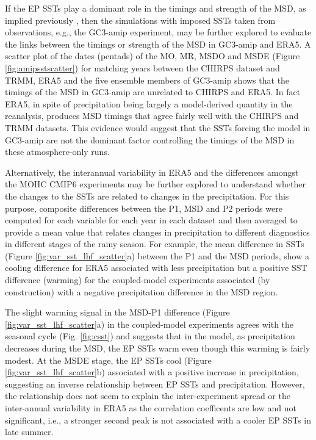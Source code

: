 If the EP SSTs play a dominant role in the timings and strength of the MSD, as implied previously \citep{magana1999,magana2005,herrera2015}, then the simulations with imposed SSTs taken from observations, e.g., the GC3-amip experiment, may be further explored to evaluate the links  between the timings or strength of the MSD in GC3-amip and ERA5. A scatter plot of the dates (pentads) of the MO, MR, MSDO and MSDE (Figure \ref{fig:amipsstscatter}) for matching years between the CHIRPS dataset and TRMM, ERA5 and the five ensemble members of GC3-amip shows that the timings of the MSD in GC3-amip are unrelated to CHIRPS and ERA5. In fact ERA5, in spite of precipitation being largely a model-derived quantity in the reanalysis, produces MSD timings that agree fairly well with the CHIRPS and TRMM datasets. 
This evidence would suggest that the SSTs forcing the model in GC3-amip are not the dominant factor controlling the timings of the MSD in these atmosphere-only runs.

Alternatively, the interannual variability in ERA5 and the differences amongst the MOHC CMIP6 experiments may be further explored to understand whether the changes to the SSTs are related to changes in the precipitation. For this purpose, composite differences between the P1, MSD and P2 periods were computed for each variable for each year in each dataset and then averaged to provide a mean value that relates changes in precipitation to different diagnostics in different stages of the rainy season.   For example, the mean difference in SSTs (Figure \ref{fig:var_sst_lhf_scatter}a) between the P1 and the MSD periods, show a cooling difference for ERA5 associated with less precipitation but a positive SST difference (warming) for the coupled-model experiments associated (by construction) with a negative precipitation difference in the MSD region. 

The slight warming signal in the MSD-P1 difference (Figure \ref{fig:var_sst_lhf_scatter}a) in the coupled-model experiments agrees with the seasonal cycle (Fig. \ref{fig:csst}) and suggests that in the model, as precipitation decreases during the MSD, the EP SSTs warm even though this warming is fairly modest. At the MSDE stage, the EP SSTs cool (Figure \ref{fig:var_sst_lhf_scatter}b) associated with a positive increase in precipitation, suggesting an inverse relationship between EP SSTs and precipitation. However, the relationship does not seem to explain the inter-experiment spread or the inter-annual variability in ERA5 as the correlation coefficents are low and not significant, i.e., a stronger second peak is not associated with a cooler EP SSTs in late summer. 

